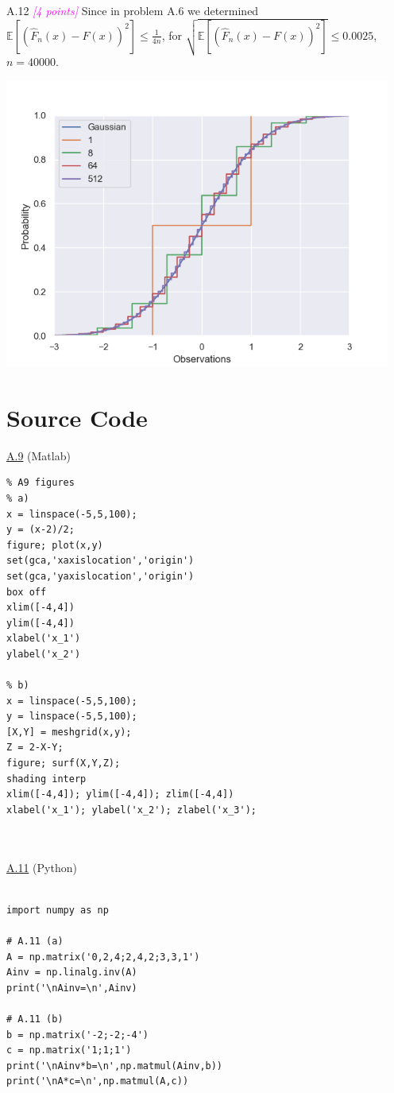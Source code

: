 \documentclass{article}
\newcommand{\1}{\mathbf{1}}
\newcommand{\E}{\mathbb{E}}
\newcommand{\points}[1]{\small\textcolor{magenta}{\emph{[#1 points]}} \normalsize}
\begin{document}
\hfill \\
A.12 \points{4} Since in problem A.6 we determined $\displaystyle \E[ ( \widehat{F}_n(x) - F(x) )^2 ] \leq \tfrac{1}{4n}$, for  $\displaystyle \sqrt{\E[ ( \widehat{F}_n(x) - F(x) )^2 ]} \leq 0.0025$, $n=40000$.
\begin{center}
	\includegraphics[width=5in]{A12.png}
\end{center} 

\clearpage
\section*{Source Code}

\underline{A.9} (Matlab) 
\begin{verbatim}
% A9 figures
% a)
x = linspace(-5,5,100);
y = (x-2)/2;
figure; plot(x,y)
set(gca,'xaxislocation','origin')
set(gca,'yaxislocation','origin')
box off
xlim([-4,4])
ylim([-4,4])
xlabel('x_1')
ylabel('x_2')

% b)
x = linspace(-5,5,100);
y = linspace(-5,5,100);
[X,Y] = meshgrid(x,y);
Z = 2-X-Y;
figure; surf(X,Y,Z);
shading interp
xlim([-4,4]); ylim([-4,4]); zlim([-4,4])
xlabel('x_1'); ylabel('x_2'); zlabel('x_3');
\end{verbatim}

\hfill \\ 
\hfill \\
\underline{A.11} (Python)
\begin{verbatim}

import numpy as np

# A.11 (a)
A = np.matrix('0,2,4;2,4,2;3,3,1')
Ainv = np.linalg.inv(A)
print('\nAinv=\n',Ainv)

# A.11 (b)
b = np.matrix('-2;-2;-4')
c = np.matrix('1;1;1')
print('\nAinv*b=\n',np.matmul(Ainv,b))
print('\nA*c=\n',np.matmul(A,c))
\end{verbatim}
\end{document}
